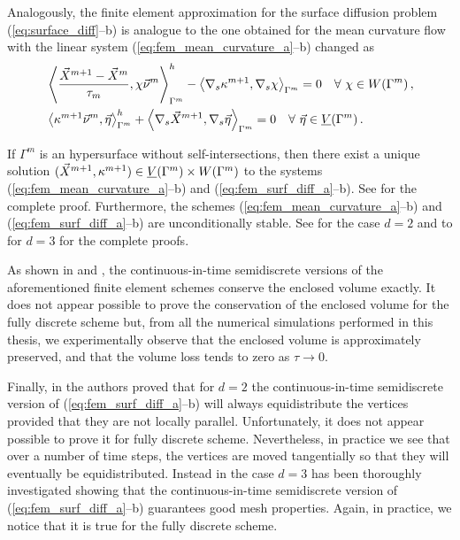 Analogously, the finite element approximation for the surface diffusion problem
(\ref{eq:surface_diff}--b) is analogue to the one obtained for the mean
curvature flow with the linear system (\ref{eq:fem_mean_curvature_a}--b)
changed as
\begin{subequations}
\begin{align}
&\left\langle \frac{\vec{X}^{m + 1} - \vec{X}^{m}}{\tau_m},
\chi\vec{\nu}^m\right\rangle_{\Gamma^m}^{h} - \left\langle\nabla_s\kappa^{m+1},
\nabla_s\chi\right\rangle_{\Gamma^m}=0\quad \forall\ \chi \in
W(\Gamma^m)\,,\label{eq:fem_surf_diff_a}\\
&\left\langle\kappa^{m+1}\vec{\nu}^m, \vec{\eta}\right\rangle_{\Gamma^m}^{h} +
\left\langle\nabla_s\vec{X}^{m + 1},
\nabla_s\vec{\eta}\right\rangle_{\Gamma^m}=0\quad \forall\ \vec\eta \in \underline{V}(\Gamma^m)\,.
\label{eq:fem_surf_diff_b}
\end{align}
\end{subequations}

If $\Gamma^m$ is an hypersurface without self-intersections, then there exist
a unique solution $(\vec{X}^{m+1}, \kappa^{m+1}) \in \underline{V}(\Gamma^m) \times W(\Gamma^m)$ to the
systems (\ref{eq:fem_mean_curvature_a}--b) and (\ref{eq:fem_surf_diff_a}--b).
See \cite[Theorem~2.1]{gflows3d} for the complete proof. Furthermore,
the schemes (\ref{eq:fem_mean_curvature_a}--b) and
(\ref{eq:fem_surf_diff_a}--b) are unconditionally stable. See
\cite[Theorem~2.3]{triplej} for the case $d = 2$ and to
\cite[Theorem~2.2]{gflows3d} for $d = 3$ for the complete proofs.

As shown in \cite[Remark~2.3]{triplej} and \cite[\S~4]{gflows3d}, the
continuous-in-time semidiscrete versions of the aforementioned finite element
schemes conserve the enclosed volume exactly. It does not appear possible to
prove the conservation of the enclosed volume for the fully discrete scheme
but, from all the numerical simulations performed in this thesis, we
experimentally observe that the enclosed volume is approximately preserved, and
that the volume loss tends to zero as $\tau \rightarrow 0$.

Finally, in \cite[Remark~2.4]{triplej} the authors proved that for $d=2$ the
continuous-in-time semidiscrete version of (\ref{eq:fem_surf_diff_a}--b)
will always equidistribute the vertices provided that they are not locally
parallel. Unfortunately, it does not appear possible to prove it for fully
discrete scheme. Nevertheless, in practice we see that over a number of time
steps, the vertices are moved tangentially so that they will eventually be
equidistributed. Instead in \cite[\S~4]{gflows3d} the case $d=3$ has been
thoroughly investigated showing that the continuous-in-time semidiscrete version
of (\ref{eq:fem_surf_diff_a}--b) guarantees good mesh properties. Again, in
practice, we notice that it is true for the fully discrete scheme.

